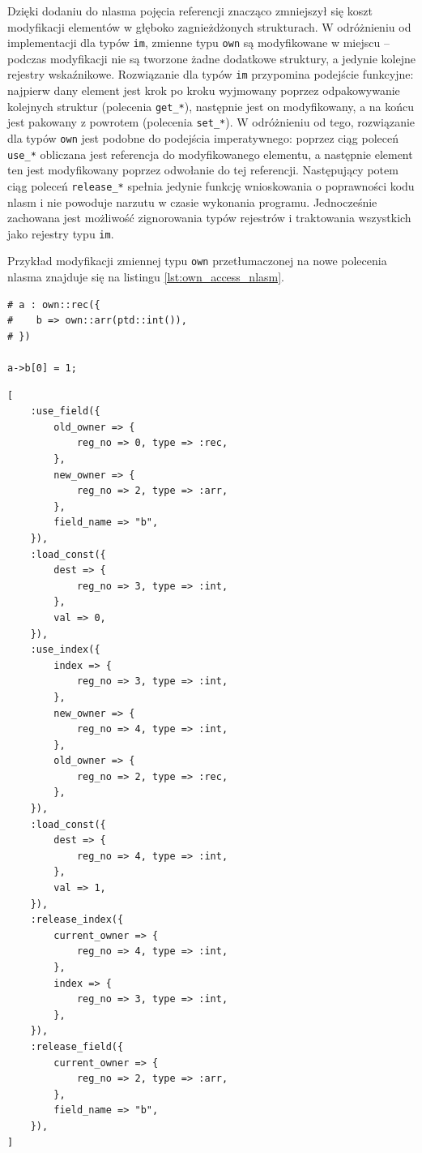 \documentclass[licencjacka]{pracamgr}
\begin{document}
Dzięki dodaniu do nlasma pojęcia referencji znacząco zmniejszył się koszt modyfikacji elementów w głęboko
zagnieżdżonych strukturach. W odróżnieniu od implementacji dla typów \texttt{im}, zmienne typu \texttt{own}
są modyfikowane w miejscu -- podczas modyfikacji nie są tworzone żadne dodatkowe struktury, a jedynie
kolejne rejestry wskaźnikowe. Rozwiązanie dla typów \texttt{im} przypomina podejście funkcyjne:
najpierw dany element jest krok po kroku wyjmowany poprzez odpakowywanie kolejnych struktur
(polecenia \texttt{get\_*}), następnie jest on modyfikowany, a na końcu jest pakowany z powrotem (polecenia
\texttt{set\_*}). W odróżnieniu od tego, rozwiązanie dla typów \texttt{own} jest podobne do podejścia
imperatywnego: poprzez ciąg poleceń \texttt{use\_*} obliczana jest referencja do modyfikowanego elementu, a
następnie element ten jest modyfikowany poprzez odwołanie do tej referencji.
Następujący potem ciąg poleceń \texttt{release\_*}
spełnia jedynie funkcję wnioskowania o poprawności kodu nlasm i nie powoduje narzutu w czasie wykonania programu.
Jednocześnie zachowana jest możliwość zignorowania typów rejestrów i traktowania wszystkich jako rejestry
typu \texttt{im}.

Przykład modyfikacji zmiennej typu \texttt{own} przetłumaczonej na nowe polecenia nlasma znajduje się na listingu 
\ref{lst:own_access_nlasm}.

\noindent\begin{minipage}[t]{.45\textwidth}
\begin{lstlisting}[caption={Modyfikacja zmiennej typu \texttt{own} w NianioLangu}]
# a : own::rec({
#    b => own::arr(ptd::int()),
# })

a->b[0] = 1;
\end{lstlisting}
\end{minipage}\hfill
\begin{minipage}[t]{.45\textwidth}
\begin{lstlisting}[caption={Modyfikacja zmiennej typu \texttt{own} przetłumaczona na nlasm},label={lst:own_access_nlasm}]
[
    :use_field({
        old_owner => {
            reg_no => 0, type => :rec,
        },
        new_owner => {
            reg_no => 2, type => :arr,
        },
        field_name => "b",
    }),
    :load_const({
        dest => {
            reg_no => 3, type => :int,
        },
        val => 0,
    }),
    :use_index({
        index => {
            reg_no => 3, type => :int,
        },
        new_owner => {
            reg_no => 4, type => :int,
        },
        old_owner => {
            reg_no => 2, type => :rec,
        },
    }),
    :load_const({
        dest => {
            reg_no => 4, type => :int,
        },
        val => 1,
    }),
    :release_index({
        current_owner => {
            reg_no => 4, type => :int,
        },
        index => {
            reg_no => 3, type => :int,
        },
    }),
    :release_field({
        current_owner => {
            reg_no => 2, type => :arr,
        },
        field_name => "b",
    }),
]
\end{lstlisting}
\end{minipage}
\end{document}
